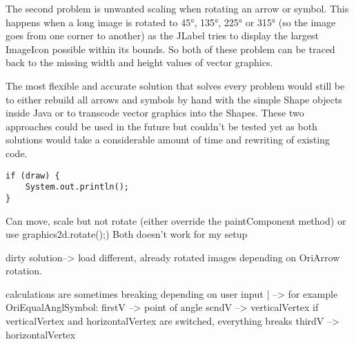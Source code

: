 The second problem is unwanted scaling when rotating an arrow or symbol. This happens when a long image is rotated to 45°, 135°, 225° or 315° (so the image goes from one corner to another) as the JLabel tries to display the largest ImageIcon possible within its bounds.
So both of these problem can be traced back to the missing width and height values of vector graphics.

The most flexible and accurate solution that solves every problem would still be to either rebuild all arrows and symbols by hand with the simple Shape objects inside Java or to transcode vector graphics into the Shapes. These two approaches could be used in the future but couldn't be tested yet as both solutions would take a considerable amount of time and rewriting of existing code.


\begin{lstlisting}
if (draw) {
	System.out.println();
}
\end{lstlisting}



Can move, scale but not rotate (either override the paintComponent method) or use graphics2d.rotate();)
Both doesn't work for my setup

dirty solution--> load different, already rotated images depending on OriArrow rotation.




calculations are sometimes breaking depending on user input
|
--> for example OriEqualAnglSymbol: 	firstV	--> point of angle
						scndV	--> verticalVertex			if verticalVertex and horizontalVertex are switched, everything breaks
						thirdV --> horizontalVertex
						
						
